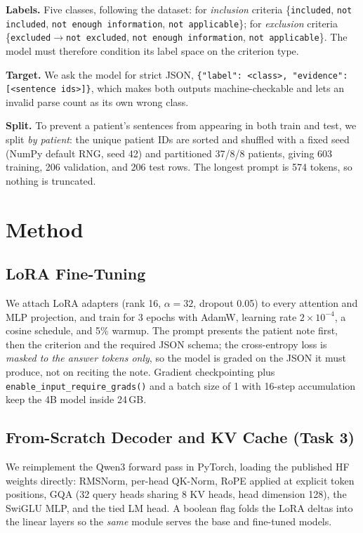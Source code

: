 \documentclass[conference]{IEEEtran}
\begin{document}
\textbf{Labels.} Five classes, following the dataset: for \emph{inclusion}
criteria \{\texttt{included}, \texttt{not included}, \texttt{not enough
information}, \texttt{not applicable}\}; for \emph{exclusion} criteria
\{\texttt{excluded}$\to$\texttt{not excluded}, \texttt{not enough information},
\texttt{not applicable}\}. The model must therefore condition its label space on
the criterion type.

\textbf{Target.} We ask the model for strict JSON,
\texttt{\{"label": <class>, "evidence": [<sentence ids>]\}}, which makes both
outputs machine-checkable and lets an invalid parse count as its own wrong class.

\textbf{Split.} To prevent a patient's sentences from appearing in both train and
test, we split \emph{by patient}: the unique patient IDs are sorted and shuffled
with a fixed seed (NumPy default RNG, seed 42) and partitioned 37/8/8 patients,
giving 603 training, 206 validation, and 206 test rows. The longest prompt is 574
tokens, so nothing is truncated.

\section{Method}
\subsection{LoRA Fine-Tuning}
\label{sec:method-ft}
We attach LoRA adapters (rank 16, $\alpha{=}32$, dropout 0.05) to every attention
and MLP projection, and train for 3 epochs with AdamW, learning rate
$2\times10^{-4}$, a cosine schedule, and 5\% warmup. The prompt presents the
patient note first, then the criterion and the required JSON schema; the
cross-entropy loss is \emph{masked to the answer tokens only}, so the model is
graded on the JSON it must produce, not on reciting the note. Gradient
checkpointing plus \texttt{enable\_input\_require\_grads()} and a batch size of 1
with 16-step accumulation keep the 4B model inside 24\,GB.

\subsection{From-Scratch Decoder and KV Cache (Task 3)}
\label{sec:method-kv}
We reimplement the Qwen3 forward pass in PyTorch, loading the published HF
weights directly: RMSNorm, per-head QK-Norm, RoPE applied at explicit token
positions, GQA (32 query heads sharing 8 KV heads, head dimension 128), the
SwiGLU MLP, and the tied LM head. A boolean flag folds the LoRA deltas into the
linear layers so the \emph{same} module serves the base and fine-tuned models.
\end{document}
